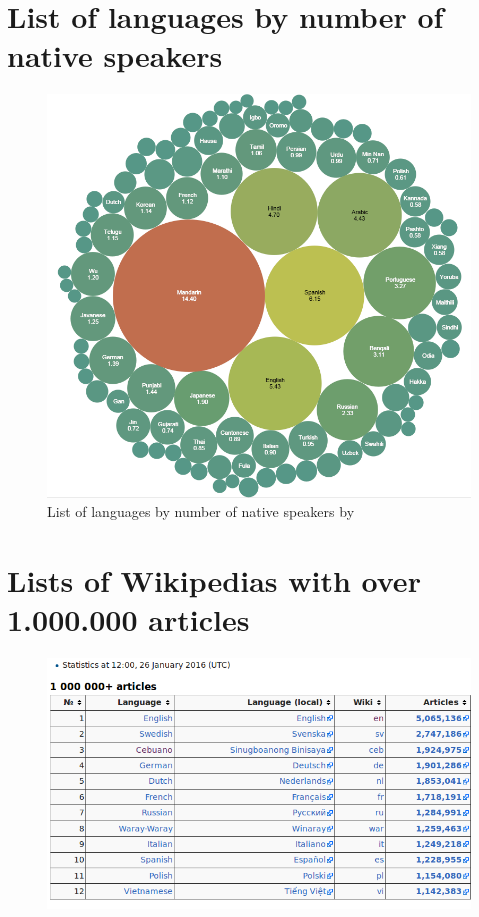 \section{List of languages by number of native speakers}
\begin{figure}[H]
	\centering
	\includegraphics[width=\textwidth]{diagrams/List_of_languages_by_number_of_native_speakers.png}
	\caption{List of languages by number of native speakers by \citet{appendixDia:02}}
	\label{fig:listLang}
\end{figure}

\section{Lists of Wikipedias with over 1.000.000 articles}
\begin{figure}[H]
	\centering
	\includegraphics[width=\textwidth]{diagrams/list-of-wikis-articles.png}
	\caption{\citet{appendixDia:03}}
	\label{fig:wikipedias-articles}
\end{figure}

